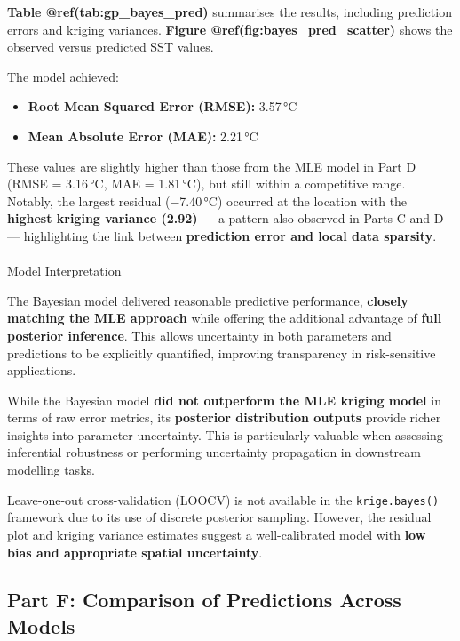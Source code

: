 \documentclass[
  11pt,
]{article}
\makeatletter
\let\oldparagraph\paragraph
\renewcommand{\paragraph}{
    \@ifstar
      \xxxParagraphStar
      \xxxParagraphNoStar
  }
\newcommand{\xxxParagraphStar}[1]{\oldparagraph*{#1}\mbox{}}
\newcommand{\xxxParagraphNoStar}[1]{\oldparagraph{#1}\mbox{}}
\makeatother
\begin{document}
\textbf{Table @ref(tab:gp\_bayes\_pred)} summarises the results,
including prediction errors and kriging variances. \textbf{Figure
@ref(fig:bayes\_pred\_scatter)} shows the observed versus predicted SST
values.

The model achieved:

\begin{itemize}
\item
  \textbf{Root Mean Squared Error (RMSE):} 3.57\,°C
\item
  \textbf{Mean Absolute Error (MAE):} 2.21\,°C
\end{itemize}

These values are slightly higher than those from the MLE model in Part D
(RMSE = 3.16\,°C, MAE = 1.81\,°C), but still within a competitive range.
Notably, the largest residual (−7.40\,°C) occurred at the location with
the \textbf{highest kriging variance (2.92)} --- a pattern also observed
in Parts C and D --- highlighting the link between \textbf{prediction
error and local data sparsity}.

\paragraph{Model Interpretation}\label{model-interpretation}

The Bayesian model delivered reasonable predictive performance,
\textbf{closely matching the MLE approach} while offering the additional
advantage of \textbf{full posterior inference}. This allows uncertainty
in both parameters and predictions to be explicitly quantified,
improving transparency in risk-sensitive applications.

While the Bayesian model \textbf{did not outperform the MLE kriging
model} in terms of raw error metrics, its \textbf{posterior distribution
outputs} provide richer insights into parameter uncertainty. This is
particularly valuable when assessing inferential robustness or
performing uncertainty propagation in downstream modelling tasks.

Leave-one-out cross-validation (LOOCV) is not available in the
\texttt{krige.bayes()} framework due to its use of discrete posterior
sampling. However, the residual plot and kriging variance estimates
suggest a well-calibrated model with \textbf{low bias and appropriate
spatial uncertainty}.

\subsection{Part F: Comparison of Predictions Across
Models}\label{part-f-comparison-of-predictions-across-models}
\end{document}
